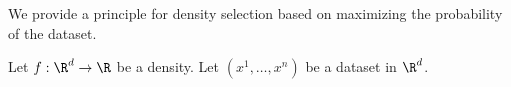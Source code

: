 

We provide a principle for density
selection based on maximizing the
probability of the dataset.


Let $f: \R^d \to \R$ be a density.
Let $(x^1, \dots, x^n)$ be a dataset
in $\R^d$.
